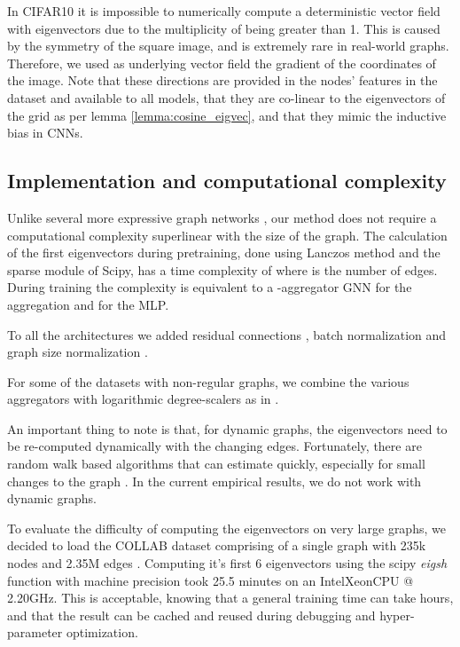 \documentclass{article} \usepackage{arxiv,times}
\begin{document}
In CIFAR10 it is impossible to numerically compute a deterministic vector field with eigenvectors due to the multiplicity of  being greater than 1. This is caused by the symmetry of the square image, and is extremely rare in real-world graphs. Therefore, we used as underlying vector field the gradient of the coordinates of the image. Note that these directions are provided in the nodes' features in the dataset and available to all models, that they are co-linear to the eigenvectors of the grid as per lemma \ref{lemma:cosine_eigvec}, and that they mimic the inductive bias in CNNs.

\subsection{Implementation and computational complexity}
\label{app:computation-complexity}
Unlike several more expressive graph networks \cite{kondor2018covariant, maron2018invariant}, our method does not require a computational complexity superlinear with the size of the graph. The calculation of the first  eigenvectors during pretraining, done using Lanczos method \cite{lanczos1950iteration} and the sparse module of Scipy, has a time complexity of  where  is the number of edges. During training the complexity is equivalent to a -aggregator GNN  \cite{corso2020principal} for the aggregation and  for the MLP.


To all the architectures we added residual connections \cite{he2016deep}, batch normalization \cite{ioffe2015batch} and graph size normalization \cite{dwivedi2020benchmarking}.

For some of the datasets with non-regular graphs, we combine the various aggregators with logarithmic degree-scalers as in \cite{corso2020principal}.

An important thing to note is that, for dynamic graphs, the eigenvectors need to be re-computed dynamically with the changing edges. Fortunately, there are random walk based algorithms that can estimate  quickly, especially for small changes to the graph \cite{doshi_fiedler_2020}. In the current empirical results, we do not work with dynamic graphs.

To evaluate the difficulty of computing the eigenvectors on very large graphs, we decided to load the COLLAB dataset comprising of a single graph with 235k nodes and 2.35M edges \cite{dwivedi2020benchmarking}. Computing it's first 6 eigenvectors using the scipy \textit{eigsh} function with machine precision took 25.5 minutes on an Intel\textregistered \space Xeon\textregistered \space CPU @ 2.20GHz. This is acceptable, knowing that a general training time can take hours, and that the result can be cached and reused during debugging and hyper-parameter optimization.
\end{document}
